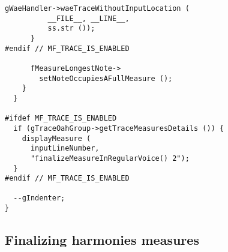 \begin{lstlisting}[language=CPlusPlus]
        gWaeHandler->waeTraceWithoutInputLocation (
          __FILE__, __LINE__,
          ss.str ());
      }
#endif // MF_TRACE_IS_ENABLED

      fMeasureLongestNote->
        setNoteOccupiesAFullMeasure ();
    }
  }

#ifdef MF_TRACE_IS_ENABLED
  if (gTraceOahGroup->getTraceMeasuresDetails ()) {
    displayMeasure (
      inputLineNumber,
      "finalizeMeasureInRegularVoice() 2");
  }
#endif // MF_TRACE_IS_ENABLED

  --gIndenter;
}
\end{lstlisting}


\subsection{Finalizing harmonies measures}

